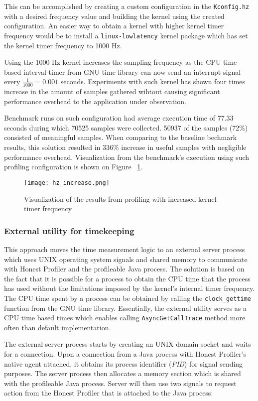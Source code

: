 \documentclass[..thesis.tex]{subfiles}
\begin{document}
This can be accomplished by creating a custom configuration in the \texttt{Kconfig.hz} with a desired frequency value and building the kernel using the created configuration. An easier way to obtain a kernel with higher kernel timer frequency would be to install a \texttt{linux-lowlatency} kernel package which has set the kernel timer frequency to 1000 Hz.

Using the 1000 Hz kernel increases the sampling frequency as the CPU time based interval timer from GNU time library can now send an interrupt signal every $\frac{1}{1000} = 0.001$ seconds. Experiments with such kernel has shown four times increase in the amount of samples gathered wihtout causing significant performance overhead to the application under observation.

Benchmark runs on such configuration had average execution time of 77.33 seconds during which 70525 samples were collected. 50937 of the samples (72\%) consisted of meaningful samples. When comparing to the baseline bechmark results, this solution resulted in 336\% increase in useful samples with negligible performance overhead. Visualization from the benchmark's execution using such profiling configuration is shown on Figure ~\ref{fig:hz_increase}.
\begin{figure}[H]
\texttt{[image: hz\_increase.png]}
\caption{Visualization of the results from profiling with increased kernel timer frequency}
\label{fig:hz_increase}
\end{figure}

\subsubsection{External utility for timekeeping}
\label{shared-mem}

This approach moves the time measurement logic to an external server process which uses UNIX operating system signals and shared memory to communicate with Honest Profiler and the profileable Java process. The solution is based on the fact that it is possible for a process to obtain the CPU time that the process has used without the limitations imposed by the kernel's internal timer frequency. The CPU time spent by a process can be obtained by calling the \texttt{clock\_\-gettime} function from the GNU time library. Essentially, the external utility serves as a CPU time based times which enables calling \texttt{Async\-Get\-Call\-Trace} method more often than default implementation.

The external server process starts by creating an UNIX domain socket and waits for a connection. Upon a connection from a Java process with Honest Profiler's native agent attached, it obtains its process identifier (\textit{PID}) for signal sending purposes. The server process then allocates a memory section which is shared with the profileable Java process. Server will then use two signals to request action from the Honest Profiler that is attached to the Java process:
\end{document}
